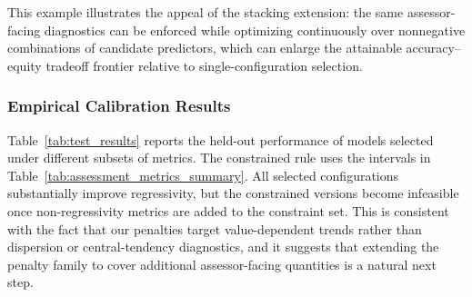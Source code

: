 \documentclass[12pt]{article}
\theoremstyle{plain}
\theoremstyle{definition}
\newcommand{\1}{\mathbf{1}}
\begin{document}
This example illustrates the appeal of the stacking extension: the same assessor-facing diagnostics can be enforced while optimizing continuously over nonnegative combinations of candidate predictors, which can enlarge the attainable accuracy--equity tradeoff frontier relative to single-configuration selection.



\subsubsection{Empirical Calibration Results}

Table~\ref{tab:test_results} reports the held-out performance of models selected under different subsets of metrics. The constrained rule uses the intervals in Table~\ref{tab:assessment_metrics_summary}. All selected configurations substantially improve regressivity, but the constrained versions become infeasible once non-regressivity metrics are added to the constraint set. This is consistent with the fact that our penalties target value-dependent trends rather than dispersion or central-tendency diagnostics, and it suggests that extending the penalty family to cover additional assessor-facing quantities is a natural next step.
\end{document}
